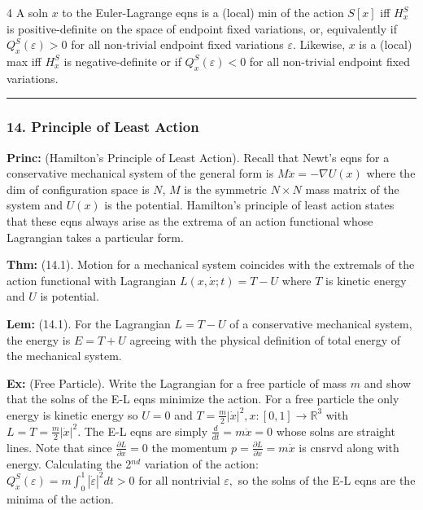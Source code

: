 \documentclass[landscape, 8pt]{extarticle}
\begin{document}
\begin{multicols*}{4}
		A soln $x$ to the Euler-Lagrange eqns is a (local) min of the action $S[x]$ iff $H^S_x$ is positive-definite on the space of endpoint fixed variations, or, equivalently if $Q^S_x(\varepsilon)>0$ for all non-trivial endpoint fixed variations $\varepsilon$. Likewise, $x$ is a (local) max iff $H^S_x$ is negative-definite or if $Q^S_x(\varepsilon)<0$ for all non-trivial endpoint fixed variations.
		
		\hrule
		\vspace*{-3pt}
		\subsubsection*{\tiny{14. Principle of Least Action}}
		\vspace*{-5pt}
		
		\textbf{Princ:} (Hamilton's Principle of Least Action). Recall that Newt's eqns for a conservative mechanical system of the general form is
		$
		M\ddot{x}=-\nabla U(x)
		$
		where the dim of configuration space is $N$, $M$ is the symmetric $N\times N$ mass matrix of the system and $U(x)$ is the potential. Hamilton's principle of least action states that these eqns always arise as the extrema of an action functional whose Lagrangian takes a particular form.
		
		\textbf{Thm:} (14.1). Motion for a mechanical system coincides with the extremals of the action functional with Lagrangian
		$
		L(x,\dot{x};t)=T-U
		$
		where $T$ is kinetic energy and $U$ is potential.
		
		\textbf{Lem:} (14.1). For the Lagrangian $L=T-U$ of a conservative mechanical system, the energy is $E=T+U$ agreeing with the physical definition of total energy of the mechanical system.
		
		\textbf{Ex:} (Free Particle). Write the Lagrangian for a free particle of mass $m$ and show that the solns of the E-L eqns minimize the action. For a free particle the only energy is kinetic energy so $U=0$ and
		$
		T=\frac{m}{2}|\dot{x}|^2, x:[0,1]\to\mathbb{R}^3
		$
		with $L=T=\frac{m}{2}|\dot{x}|^2$. The E-L eqns are simply
		$
		\frac{d}{dt}=m\ddot{x}=0
		$
		whose solns are straight lines. Note that since $\frac{\partial L}{\partial x}=0$ the momentum $p=\frac{\partial L}{\partial\dot{x}}=m\dot{x}$ is cnsrvd along with energy. Calculating the 2$^{nd}$ variation of the action:
		$
		Q^S_x(\varepsilon)=m\int_0^1|\dot\varepsilon|^2dt>0\text{ for all nontrivial }\varepsilon,
		$
		so the solns of the E-L eqns are the minima of the action.
		

\end{multicols*}
\end{document}
